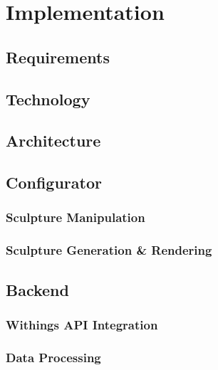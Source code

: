 \documentclass[Medieninformatik-arbeit.tex]{subfiles}
\begin{document}
\label{ch:conf}

\section{Implementation}
\subsection{Requirements}
\subsection{Technology}
\subsection{Architecture}
\subsection{Configurator}
\subsubsection{Sculpture Manipulation}
\subsubsection{Sculpture Generation \& Rendering}
\subsection{Backend}
\subsubsection{Withings API Integration}
\subsubsection{Data Processing}
\end{document}
